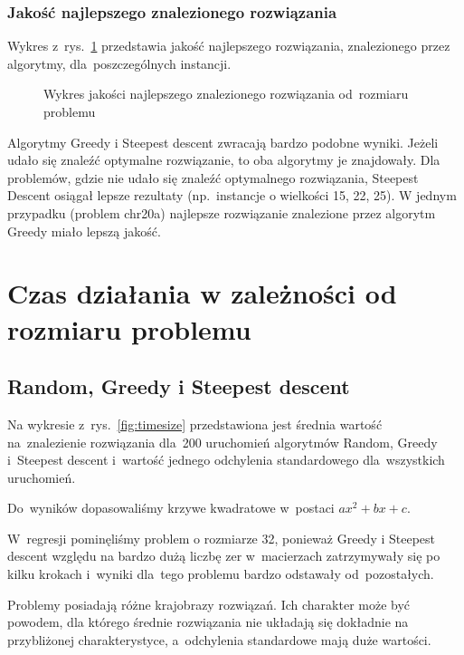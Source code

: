 \documentclass[a4paper,10pt]{article}
\begin{document}
\subsubsection{Jakość najlepszego znalezionego rozwiązania}
Wykres z~rys.~\ref{fig:qualityvssizemax} przedstawia jakość najlepszego rozwiązania, znalezionego przez algorytmy, dla~poszczególnych instancji.

\begin{figure}[h!]
\begin{center}

\caption{Wykres jakości najlepszego znalezionego rozwiązania od~rozmiaru problemu}
\label{fig:qualityvssizemax}
\end{center}
\end{figure}

Algorytmy Greedy i Steepest descent zwracają bardzo podobne wyniki.
Jeżeli udało się znaleźć optymalne rozwiązanie, to oba algorytmy je znajdowały.
Dla problemów, gdzie nie udało się znaleźć optymalnego rozwiązania, Steepest Descent osiągał lepsze rezultaty (np.~instancje o wielkości 15, 22, 25).
W jednym przypadku (problem chr20a) najlepsze rozwiązanie znalezione przez algorytm Greedy miało lepszą jakość. 

\section{Czas działania w zależności od rozmiaru problemu}
\subsection{Random, Greedy i Steepest descent}
Na wykresie z~rys.~\ref{fig:timesize} przedstawiona jest średnia wartość na~znalezienie rozwiązania
dla~200 uruchomień algorytmów Random, Greedy i~Steepest descent
i~wartość jednego odchylenia standardowego dla~wszystkich uruchomień.

Do~wyników dopasowaliśmy krzywe kwadratowe w~postaci $ax^2+bx+c$.

W~regresji pominęliśmy problem o rozmiarze 32, ponieważ Greedy i Steepest descent względu na bardzo dużą liczbę zer
w~macierzach zatrzymywały się po kilku krokach i~wyniki dla~tego problemu bardzo odstawały od~pozostałych.


Problemy posiadają różne krajobrazy rozwiązań.
Ich charakter może być powodem, dla którego średnie rozwiązania nie układają się dokładnie na przybliżonej charakterystyce,
a~odchylenia standardowe mają duże wartości.
\end{document}
